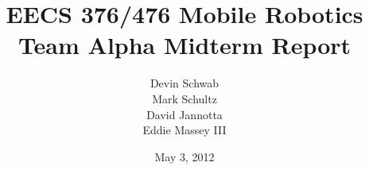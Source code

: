 \documentclass[10pt,letterpaper,draft]{report}
\author{Devin Schwab\\
  Mark Schultz\\
  David Jannotta\\
  Eddie Massey III}
\title{EECS 376/476 Mobile Robotics\\
  Team Alpha Midterm Report} \date{May 3, 2012}
\begin{document}

\listoftodos
\maketitle

\tableofcontents
\newpage










\end{document}
